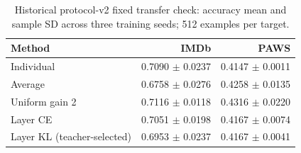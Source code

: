 \begin{table}[H]\centering\small
\caption{Historical protocol-v2 fixed transfer check: accuracy mean and sample SD across three training seeds; 512 examples per target.}
\begin{tabular}{lrr}\toprule
Method & IMDb & PAWS\\\midrule
Individual & 0.7090 $\pm$ 0.0237 & 0.4147 $\pm$ 0.0011\\
Average & 0.6758 $\pm$ 0.0276 & 0.4258 $\pm$ 0.0135\\
Uniform gain 2 & 0.7116 $\pm$ 0.0118 & 0.4316 $\pm$ 0.0220\\
Layer CE & 0.7051 $\pm$ 0.0198 & 0.4167 $\pm$ 0.0074\\
Layer KL (teacher-selected) & 0.6953 $\pm$ 0.0237 & 0.4167 $\pm$ 0.0041\\
\bottomrule\end{tabular}\end{table}
